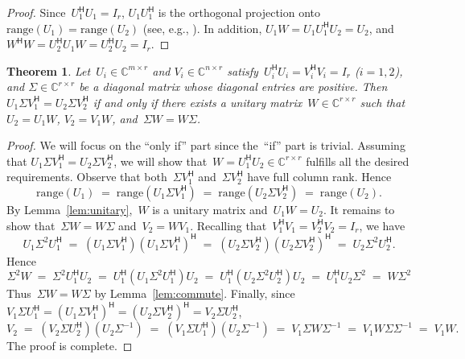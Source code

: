 \documentclass[11pt,a4paper]{article}  %
\numberwithin{equation}{section}
\newtheorem{theorem}{Theorem}%
\theoremstyle{definition}
\def\CC{\mathbb{C}}
\newcommand{\hmt}{{\scriptscriptstyle{{\mathsf{H}}}}}
\newcommand{\range}{\mathrm{range}}
\newcommand{\eg}{{e.g.}}
\begin{document}
\begin{proof}
  Since~$U_1^\hmt U_1 = I_r$, $U_1U_1^\hmt$ is the orthogonal projection onto~$\range(U_1)
  = \range(U_2)$ (see, \eg, \cite{Han_Neumann_2013}). In addition,
 $U_1 W = U_1 U_1^\hmt U_2 = U_2$, and $W^\hmt W = U_2^\hmt U_1 W = U_2^\hmt U_2 = I_r$.
\end{proof}


\begin{theorem}
  \label{th:svdunique}
  Let~$U_i\in \CC^{m\times r}$ and $V_i\in \CC^{n\times r}$ satisfy~$U_i^\hmt
  U_i=V_i^{\hmt} V_i = I_r$ \textnormal{(}$i=1,2$\textnormal{)}, and
  $\Sigma \in \CC^{r\times r}$ be a diagonal matrix whose diagonal entries are positive.
  Then~$U_1 \Sigma V_1^{\hmt} = U_2 \Sigma V_2^{\hmt}$ if and only if there exists
  a unitary matrix~$W\in\CC^{r\times r}$ such that~$U_2=U_1 W$, $V_2 = V_1 W$, and~$\Sigma
  W = W\Sigma$.
\end{theorem}

\begin{proof}
We will focus on the ``only if'' part since the~``if'' part is trivial.
Assuming that $U_1\Sigma V_1^\hmt = U_2\Sigma V_2^\hmt$,
we will show that~$W = U_1^\hmt U_2\in \CC^{r\times r}$ fulfills all the desired requirements.
Observe that both~$\Sigma V_1^\hmt$ and~$\Sigma V_2^\hmt$ have full column rank. Hence
\begin{equation*}
  \range(U_1) \;=\; \range(U_1\Sigma V_1^\hmt)
  \;=\; \range(U_2\Sigma V_2^\hmt) \;=\; \range(U_2).
\end{equation*}
By Lemma~\ref{lem:unitary},~$W$ is a unitary matrix and~$U_1W = U_2$.
It remains to show that~$\Sigma W = W\Sigma$ and~$V_2 = WV_1$.
Recalling that~$V_1^\hmt V_1 = V_2^\hmt V_2= I_r$, we have
\begin{equation}
  \nonumber
  U_1\Sigma^2 U_1^\hmt
  \;=\; (U_1\Sigma V_1^\hmt) (U_1 \Sigma V_1^\hmt)^\hmt
  \;=\; (U_2\Sigma V_2^\hmt) (U_2 \Sigma V_2^\hmt)^\hmt
  \;=\; U_2\Sigma^2 U_2^\hmt.
\end{equation}
Hence
\begin{equation*}
  \Sigma^2W
  \;=\;\Sigma^2U_1^\hmt U_2
  \;=\; U_1^\hmt(U_1 \Sigma^2 U_1^\hmt) U_2
  \;=\; U_1^\hmt(U_2 \Sigma^2 U_2^\hmt) U_2
  \;=\; U_1^\hmt U_2 \Sigma^2
  \;=\; W\Sigma^2
\end{equation*}
Thus~$\Sigma W=W\Sigma$ by Lemma~\ref{lem:commute}.
Finally, since~$V_1 \Sigma U_1^\hmt =(U_1\Sigma V_1^\hmt)^\hmt = (U_2\Sigma V_2^\hmt)^\hmt= V_2 \Sigma
U_2^\hmt$,
\begin{equation*}
  V_2
  \;=\;(V_2\Sigma U_2^\hmt)(U_2 \Sigma^{-1})
  \;=\;(V_1\Sigma U_1^\hmt)(U_2 \Sigma^{-1})
  \;=\; V_1 \Sigma W \Sigma^{-1}
  \;=\; V_1 W \Sigma \Sigma^{-1}
  \;=\; V_1W.
\end{equation*}
The proof is complete.
\end{proof}
\end{document}
